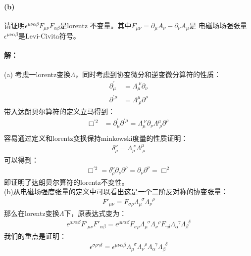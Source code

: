 \documentclass[a4paper]{ctexart}
\begin{document}
    \paragraph{(b)} 请证明$\epsilon^{\mu \nu \alpha \beta}F_{\mu \nu}F_{\alpha\beta}$是lorentz
    不变量。其中$F_{\mu\nu} = \partial_{\mu}A_{\nu} - \partial_{\nu}A_{\mu}$是
    电磁场场强张量$\epsilon^{\mu \nu \alpha \beta}$是Levi-Civita符号。
    \paragraph{解：}
    (a) 考虑一lorentz变换$\Lambda$，同时考虑到协变微分和逆变微分算符的性质：
    \begin{align}
        \partial^{'}_{\mu} &= \Lambda_{\mu}^{\;\nu}\partial_{\nu}\\
        \partial^{'\mu} &= \Lambda^{\mu}_{\;\rho}\partial^{\rho}
    \end{align}
    带入达朗贝尔算符的定义立马得到：
    \begin{align}
        \Box^{'2} &= \partial^{'}_{\mu}\partial^{'\mu} = \Lambda_{\mu}^{\;\nu}\partial_{\nu}\Lambda^{\mu}_{\;\rho}\partial^{\rho}\\
    \end{align}
    容易通过定义和lorentz变换保持minkowski度量的性质证明：
    \begin{align}
        \delta_{\rho}^{\nu} = \Lambda_{\mu}^{\;\nu}\Lambda^{\mu}_{\;\rho}
    \end{align}
    可以得到： 
    \begin{align}
        \Box^{'2} = \delta_{\rho}^{\nu}\partial_{\nu}\partial^{\rho} = \partial_{\nu}\partial^{\nu} = \Box^{2}
    \end{align}
    即证明了达朗贝尔算符的lorentz不变性。\\
    (b)从电磁场强度张量的定义中可以看出这是一个二阶反对称的协变张量：
    \begin{align}
        F'_{\mu\nu} = F_{\sigma\rho}\Lambda_{\mu}^{\;\;\sigma}\Lambda_{\nu}^{\;\;\rho}
    \end{align}
    那么在lorentz变换$\Lambda$下，原表达式变为：
    \begin{align}
        \epsilon^{\mu\nu\alpha\beta}F'_{\mu\nu}F'_{\alpha\beta} = \epsilon^{\mu\nu\alpha\beta}F_{\sigma\rho}\Lambda_{\mu}^{\;\;\sigma}\Lambda_{\nu}^{\;\;\rho}
        F_{\gamma\delta}\Lambda_{\alpha}^{\;\;\gamma}\Lambda_{\beta}^{\;\;\delta}
    \end{align}
     我们的重点是证明：
    \begin{align}
        \epsilon^{\sigma\rho\gamma\delta} = \epsilon^{\mu\nu\alpha\beta}\Lambda_{\mu}^{\;\;\sigma}\Lambda_{\nu}^{\;\;\rho}\Lambda_{\alpha}^{\;\;\gamma}\Lambda_{\beta}^{\;\;\delta}
    \end{align}
\end{document}
